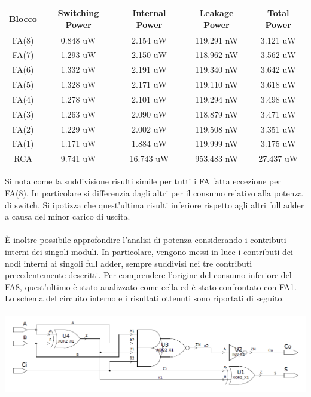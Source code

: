 \documentclass[11pt,  english, makeidx, a4paper, titlepage, oneside]{book}
\begin{document}
\\
\begin{center}
	\begin{tabular}{|c|c|c|c|c|}
	\hline
	Blocco &  Switching Power & Internal Power & Leakage Power & Total Power \\ 
	\hline
	FA(8) & 0.848 uW & 2.154 uW & 119.291 nW & 3.121 uW  \\
	\hline
	FA(7) & 1.293 uW & 2.150 uW & 118.962 nW & 3.562 uW  \\
	\hline
	FA(6) & 1.332 uW & 2.191 uW & 119.340 nW & 3.642 uW  \\
	\hline
	FA(5) & 1.328 uW & 2.171 uW & 119.110 nW & 3.618 uW  \\
	\hline
	FA(4) & 1.278 uW & 2.101 uW & 119.294 nW & 3.498 uW  \\
	\hline
	FA(3) & 1.263 uW & 2.090 uW & 118.879 nW & 3.471 uW  \\
	\hline
	FA(2) & 1.229 uW & 2.002 uW & 119.508 nW & 3.351 uW  \\
	\hline
	FA(1) & 1.171 uW & 1.884 uW & 119.999 nW & 3.175 uW  \\
	\hline
	RCA & 9.741 uW & 16.743 uW & 953.483 nW & 27.437 uW  \\
	\hline
	\end{tabular}
\end{center}
\vspace{0.3cm}
Si nota come la suddivisione risulti simile per tutti i FA fatta eccezione per FA(8). In particolare si differenzia dagli altri per il consumo relativo alla potenza di switch. Si ipotizza che quest'ultima risulti inferiore rispetto agli altri full adder a causa del minor carico di uscita.
\\\\
È inoltre possibile approfondire l'analisi di potenza considerando i contributi interni dei singoli moduli. In particolare, vengono messi in luce i contributi dei nodi interni ai singoli full adder, sempre suddivisi nei tre contributi precedentemente descritti.
Per comprendere l'origine del consumo inferiore del FA8, quest'ultimo è stato analizzato come cella ed è stato confrontato con FA1.
Lo schema del circuito interno e i risultati ottenuti sono riportati di seguito.
\\\\
\includegraphics[width=15cm]{./img/Lab_1/Es_3/Full_adder.png}
\end{document}
